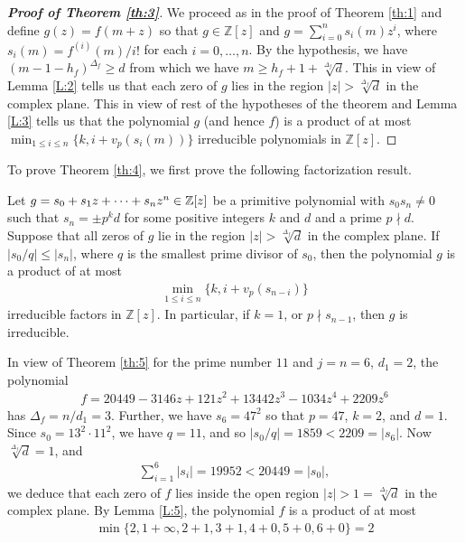 \documentclass[12pt]{amsart}%
\begin{document}
\begin{proof}[\bf Proof of Theorem \ref{th:3}] We proceed as in the proof of Theorem \ref{th:1} and define  $g(z)=f(m+z)$ so that $g\in \mathbb{Z}[z]$ and $g=\sum_{i=0}^n s_i(m) z^i$, where $s_i(m)=f^{(i)}(m)/i!$ for each $i=0,\ldots,n$. By the hypothesis, we have $(m-1-h_f)^{\Delta_f}\geq d$ from which we have $m\geq h_f+1+\sqrt[\Delta_f]{d}$.  This in view of Lemma \ref{L:2} tells us that each zero of $g$ lies in the region $|z|> \sqrt[\Delta_f]{d}$ in the complex plane. This in view of rest of the hypotheses of the theorem and Lemma \ref{L:3} tells us that the polynomial $g$ (and hence $f$) is a product of at most $\min_{1\leq i\leq n}\{k,i+v_p(s_i(m))\}$ irreducible polynomials in $\mathbb{Z}[z]$.
\end{proof}
To prove Theorem \ref{th:4}, we first prove the following factorization result.
\begin{lemma}\label{L:5}
Let $g = s_0 + s_1z +\cdots+s_n z^n\in \Bbb{Z}[z]$ be a primitive polynomial with $s_0s_n\neq 0$ such that $s_n=\pm p^k d$ for some  positive integers $k$ and $d$ and a prime $p\nmid d$. Suppose that all zeros of $g$ lie in the region $|z|>\sqrt[\Delta_f]{d}$ in the complex plane.  If $|s_0/q|\leq |s_n|$, where $q$ is the smallest prime divisor of $s_0$, then the polynomial $g$ is a product of at most
\begin{eqnarray*}
\min_{1\leq i\leq n}\{k,i+v_p(s_{n-i})\}
\end{eqnarray*}
irreducible factors in $\mathbb{Z}[z]$. In particular, if $k=1$, or $p\nmid s_{n-1}$, then $g$ is irreducible.
\end{lemma}
In view of Theorem \ref{th:5} for the prime number $11$ and $j=n=6$, $d_1=2$, the polynomial
	\begin{eqnarray*}
		f=20449-3146z+121z^2+13442z^3-1034z^4+2209z^6
	\end{eqnarray*}
	has $\Delta_f=n/d_1=3$. Further, we have $s_6=47^2$ so that $p=47$, $k=2$, and $d=1$. Since $s_0=13^2\cdot11^2$, we have $q=11$, and so $|s_0/q|=1859<2209=|s_6|$. Now $\sqrt[\Delta_f]{d}=1$, and
	\begin{eqnarray*}
		\sum_{i=1}^{6}|s_i|=19952<20449=|s_0|,
	\end{eqnarray*}
	we deduce that each zero of $f$ lies inside the open region $|z|>1=\sqrt[\Delta_f]{d}$ in the complex plane. By Lemma \ref{L:5}, the polynomial $f$ is a product of at most
\begin{eqnarray*}
\min\{2,1+\infty,2+1,3+1,4+0,5+0,6+0\}=2
\end{eqnarray*}
\end{document}

